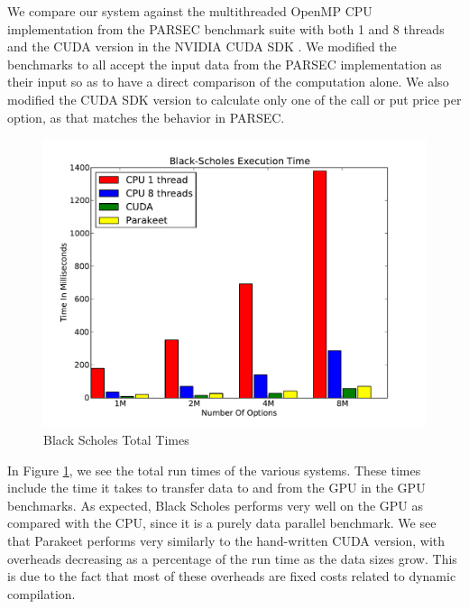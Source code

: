 \documentclass[10pt,twocolumn]{article}
\begin{document}
We compare our system against the multithreaded OpenMP CPU implementation from the PARSEC \cite{Bien08} benchmark suite with both 1 and 8 threads and the CUDA version in the NVIDIA CUDA SDK \cite{NvidSD}.  We modified the benchmarks to all accept the input data from the PARSEC implementation as their input so as to have a direct comparison of the computation alone.  We also modified the CUDA SDK version to calculate only one of the call or put price per option, as that matches the behavior in PARSEC.

\begin{figure}[h!]
\includegraphics[scale=0.45]{BSWCPU.pdf}
\caption{Black Scholes Total Times}
\label{BSCPU}
\end{figure}


In Figure \ref{BSCPU}, we see the total run times of the various systems. These times include the time it takes to transfer data to and from the GPU in the GPU benchmarks.  As expected, Black Scholes performs very well on the GPU as compared with the CPU, since it is a purely data parallel benchmark.  We see that Parakeet performs very similarly to the hand-written CUDA version, with overheads decreasing as a percentage of the run time as the data sizes grow.  This is due to the fact that most of these overheads are fixed costs related to dynamic compilation.
\end{document}
